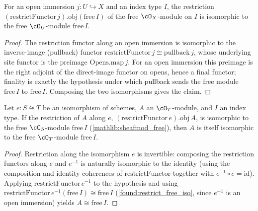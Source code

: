 \begin{lemma}
  \label{found:restrict_free_iso}
  For an open immersion \(j:U\hookrightarrow X\) and an index type \(I\), the
  restriction \((\mathrm{restrictFunctor}\,j).\mathrm{obj}(\mathrm{free}\,I)\) of the
  free \(\cO_X\)-module on \(I\) is isomorphic to the free \(\cO_U\)-module
  \(\mathrm{free}\,I\).
\end{lemma}

\begin{proof}
  \leanok
  The restriction functor along an open immersion is isomorphic to the inverse-image
  (pullback) functor \(\mathrm{restrictFunctor}\,j\cong\mathrm{pullback}\,j\), whose
  underlying site functor is the preimage \(\mathrm{Opens.map}\,j\).  For an open
  immersion this preimage is the right adjoint of the direct-image functor on opens,
  hence a final functor; finality is exactly the hypothesis under which pullback sends
  the free module \(\mathrm{free}\,I\) to \(\mathrm{free}\,I\).  Composing the two
  isomorphisms gives the claim.
\end{proof}

\begin{lemma}
  \label{found:free_iso_of_restrict_iso}
  Let \(e:S\cong T\) be an isomorphism of schemes, \(A\) an \(\cO_T\)-module, and
  \(I\) an index type.  If the restriction of \(A\) along \(e\),
  \((\mathrm{restrictFunctor}\,e).\mathrm{obj}\,A\), is isomorphic to the free
  \(\cO_S\)-module \(\mathrm{free}\,I\) (\cref{mathlib:sheafmod_free}), then \(A\) is
  itself isomorphic to the free \(\cO_T\)-module \(\mathrm{free}\,I\).
\end{lemma}

\begin{proof}
  \leanok
  Restriction along the isomorphism \(e\) is invertible: composing the restriction
  functors along \(e\) and \(e^{-1}\) is naturally isomorphic to the identity (using
  the composition and identity coherences of \(\mathrm{restrictFunctor}\) together
  with \(e^{-1}\circ e=\mathrm{id}\)).  Applying \(\mathrm{restrictFunctor}\,e^{-1}\)
  to the hypothesis and using \(\mathrm{restrictFunctor}\,e^{-1}(\mathrm{free}\,I)
  \cong\mathrm{free}\,I\) (\cref{found:restrict_free_iso}, since \(e^{-1}\) is an open
  immersion) yields \(A\cong\mathrm{free}\,I\).
\end{proof}

